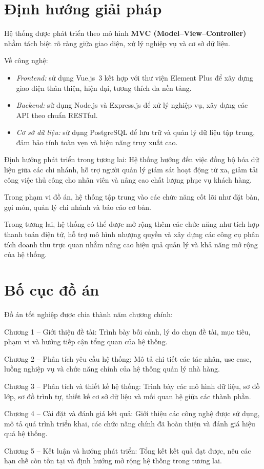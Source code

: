\documentclass[../DoAn.tex]{subfiles}
\begin{document}
\section{Định hướng giải pháp}
\label{section:1.3}
Hệ thống được phát triển theo mô hình \textbf{MVC (Model–View–Controller)} nhằm tách biệt rõ ràng giữa giao diện, xử lý nghiệp vụ và cơ sở dữ liệu.

Về công nghệ:
\begin{itemize}
    \item \textit{Frontend:} sử dụng Vue.js~3 kết hợp với thư viện Element Plus để xây dựng giao diện thân thiện, hiện đại, tương thích đa nền tảng.
    \item \textit{Backend:} sử dụng Node.js và Express.js để xử lý nghiệp vụ, xây dựng các API theo chuẩn RESTful.
    \item \textit{Cơ sở dữ liệu:} sử dụng PostgreSQL để lưu trữ và quản lý dữ liệu tập trung, đảm bảo tính toàn vẹn và hiệu năng truy xuất cao.
\end{itemize}

Định hướng phát triển trong tương lai:
Hệ thống hướng đến việc đồng bộ hóa dữ liệu giữa các chi nhánh, hỗ trợ người quản lý giám sát hoạt động từ xa, giảm tải công việc thủ công cho nhân viên và nâng cao chất lượng phục vụ khách hàng.  

Trong phạm vi đồ án, hệ thống tập trung vào các chức năng cốt lõi như đặt bàn, gọi món, quản lý chi nhánh và báo cáo cơ bản.  

Trong tương lai, hệ thống có thể được mở rộng thêm các chức năng như tích hợp thanh toán điện tử, hỗ trợ mô hình nhượng quyền và xây dựng các công cụ phân tích doanh thu trực quan nhằm nâng cao hiệu quả quản lý và khả năng mở rộng của hệ thống.

\section{Bố cục đồ án}
\label{section:1.4}
Đồ án tốt nghiệp được chia thành năm chương chính:  

Chương 1 – Giới thiệu đề tài: Trình bày bối cảnh, lý do chọn đề tài, mục tiêu, phạm vi và hướng tiếp cận tổng quan của hệ thống.

Chương 2 – Phân tích yêu cầu hệ thống: Mô tả chi tiết các tác nhân, use case, luồng nghiệp vụ và chức năng chính của hệ thống quản lý nhà hàng.

Chương 3 – Phân tích và thiết kế hệ thống: Trình bày các mô hình dữ liệu, sơ đồ lớp, sơ đồ trình tự, thiết kế cơ sở dữ liệu và mối quan hệ giữa các thành phần.

Chương 4 – Cài đặt và đánh giá kết quả: Giới thiệu các công nghệ được sử dụng, mô tả quá trình triển khai, các chức năng chính đã hoàn thiện và đánh giá hiệu quả hệ thống.

Chương 5 – Kết luận và hướng phát triển: Tổng kết kết quả đạt được, nêu các hạn chế còn tồn tại và định hướng mở rộng hệ thống trong tương lai.
\end{document}
